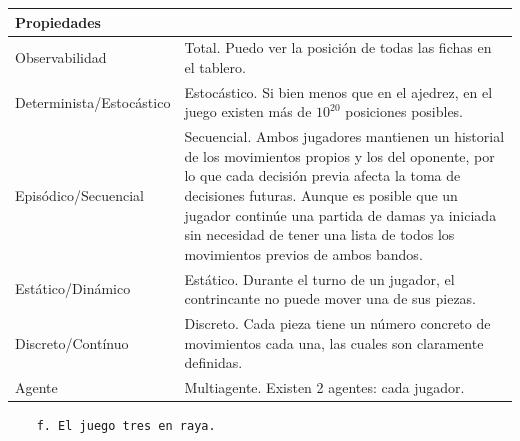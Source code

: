 \documentclass[11pt]{article}
\begin{document}
\begin{longtable}[]{@{}
  >{\raggedright\arraybackslash}p{}
  >{\raggedright\arraybackslash}p{}@{}}
\toprule\noalign{}
\begin{minipage}[b]{\linewidth}\raggedright
Propiedades
\end{minipage} & \begin{minipage}[b]{\linewidth}\raggedright
\end{minipage} \\
\midrule\noalign{}
\endhead
\bottomrule\noalign{}
\endlastfoot
Observabilidad & Total. Puedo ver la posición de todas las fichas en el
tablero. \\
Determinista/Estocástico & Estocástico. Si bien menos que en el ajedrez,
en el juego existen más de \(10^{20}\) posiciones posibles. \\
Episódico/Secuencial & Secuencial. Ambos jugadores mantienen un
historial de los movimientos propios y los del oponente, por lo que cada
decisión previa afecta la toma de decisiones futuras. Aunque es posible
que un jugador continúe una partida de damas ya iniciada sin necesidad
de tener una lista de todos los movimientos previos de ambos bandos. \\
Estático/Dinámico & Estático. Durante el turno de un jugador, el
contrincante no puede mover una de sus piezas. \\
Discreto/Contínuo & Discreto. Cada pieza tiene un número concreto de
movimientos cada una, las cuales son claramente definidas. \\
Agente & Multiagente. Existen 2 agentes: cada jugador. \\
\end{longtable}

\begin{verbatim}
    f. El juego tres en raya.
\end{verbatim}
\end{document}
